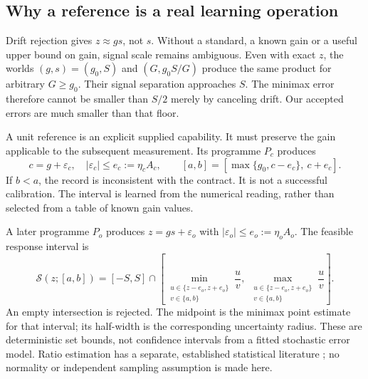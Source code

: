 \documentclass[11pt,letterpaper]{article}
\theoremstyle{definition}\newtheorem{definition}[theorem]{Definition}
\theoremstyle{remark}\newtheorem{remark}[theorem]{Remark}
\begin{document}
\subsection{Why a reference is a real learning operation}
Drift rejection gives $z\approx gs$, not $s$. Without a standard, a known gain or a useful upper bound on gain, signal scale remains ambiguous. Even with exact $z$, the worlds $(g,s)=(g_0,S)$ and $(G,g_0S/G)$ produce the same product for arbitrary $G\ge g_0$. Their signal separation approaches $S$. The minimax error therefore cannot be smaller than $S/2$ merely by canceling drift. Our accepted errors are much smaller than that floor.

A unit reference is an explicit supplied capability. It must preserve the gain applicable to the subsequent measurement. Its programme $P_c$ produces
\begin{equation}
 c=g+\varepsilon_c,\quad |\varepsilon_c|\le e_c:=\eta_c A_c,
 \qquad
 [a,b]=[\max\{g_0,c-e_c\},\ c+e_c].
 \label{eq:gaininterval}
\end{equation}
If $b<a$, the record is inconsistent with the contract. It is not a successful calibration. The interval is learned from the numerical reading, rather than selected from a table of known gain values.

A later programme $P_o$ produces $z=gs+\varepsilon_o$ with $|\varepsilon_o|\le e_o:=\eta_o A_o$. The feasible response interval is
\begin{equation}
 \mathcal S(z;[a,b])=[-S,S]\cap
 \left[\min_{\substack{u\in\{z-e_o,z+e_o\}\\v\in\{a,b\}}}\frac{u}{v},\
       \max_{\substack{u\in\{z-e_o,z+e_o\}\\v\in\{a,b\}}}\frac{u}{v}\right].
 \label{eq:ratiointerval}
\end{equation}
An empty intersection is rejected. The midpoint is the minimax point estimate for that interval; its half-width is the corresponding uncertainty radius. These are deterministic set bounds, not confidence intervals from a fitted stochastic error model. Ratio estimation has a separate, established statistical literature \cite{fieller}; no normality or independent sampling assumption is made here.
\end{document}
